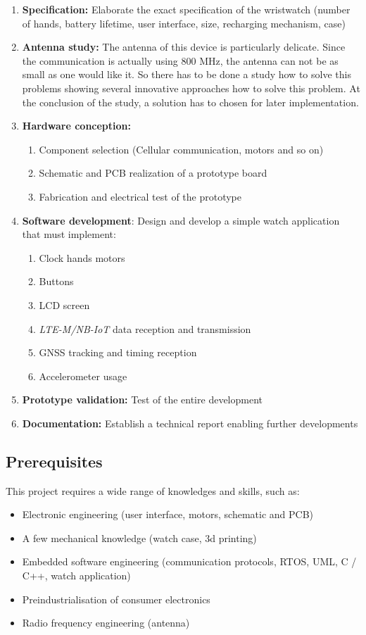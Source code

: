 \documentclass[Report.tex]{subfiles}
\begin{document}
\begin{enumerate}
\item \textbf{Specification:} Elaborate the exact specification of the wristwatch (number of hands, battery lifetime, user interface, size, recharging mechanism, case)
\item \textbf{Antenna study:} The antenna of this device is particularly delicate. Since the communication is actually using 800 MHz, the antenna can not be as small as one would like it. So there has to be done a study how to solve this problems showing several innovative approaches how to solve this problem. At the conclusion of the study, a solution has to chosen for later implementation.
\item \textbf{Hardware conception:}
\begin{enumerate}
	\item Component selection (Cellular communication, motors and so on)
	\item Schematic and PCB realization of a prototype board 
	\item Fabrication and electrical test of the prototype
\end{enumerate} 
\item \textbf{Software development}: Design and develop a simple watch application that must implement:
\begin{enumerate}
\item Clock hands motors
\item Buttons
\item LCD screen
\item \textit{LTE-M/NB-IoT} data reception and transmission
\item GNSS tracking and timing reception
\item Accelerometer usage
\end{enumerate}
\item \textbf{Prototype validation:} Test of the entire development
\item \textbf{Documentation:} Establish a technical report enabling further developments
\end{enumerate}

\subsection{Prerequisites}
This project requires a wide range of knowledges and skills, such as:
\begin{itemize}
\item Electronic engineering (user interface, motors, schematic and PCB)
\item A few mechanical knowledge (watch case, 3d printing)
\item Embedded software engineering (communication protocols, RTOS, UML, C / C++, watch application)
\item Preindustrialisation of consumer electronics
\item Radio frequency engineering (antenna)
\end{itemize}
\end{document}
